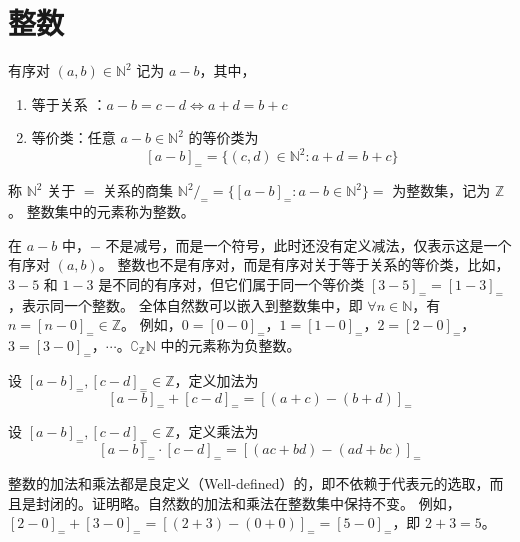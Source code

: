 \section{整数}

\begin{definition}[整数 Integer]
    有序对 $(a,b)\in \mathbb{N}^2$ 记为 $a-b$，其中，
    \begin{enumerate}
        \item 等于关系 ：$a-b=c-d \iff a+d=b+c$
        \item 等价类：任意 $a-b\in\mathbb{N}^2$ 的等价类为
        \[
            [a-b]_{=} = \{(c,d)\in\mathbb{N}^2 : a+d=b+c\} 
        \]
    \end{enumerate}
    称 $\mathbb{N}^2$ 关于 $=$ 关系的商集 $\mathbb{N}^2/_{=}= \{[a-b]_{=} : a-b \in \mathbb{N}^2\}= $ 为整数集，记为 $\mathbb{Z}$。
    整数集中的元素称为整数。
\end{definition}
\begin{note}
    在 $a-b$ 中，$-$ 不是减号，而是一个符号，此时还没有定义减法，仅表示这是一个有序对 $(a,b)$。
    整数也不是有序对，而是有序对关于等于关系的等价类，比如， $3-5$ 和 $1-3$ 是不同的有序对，但它们属于同一个等价类 $[3-5]_{=}=[1-3]_{=}$，表示同一个整数。
    全体自然数可以嵌入到整数集中，即 $\forall n\in\mathbb{N}$，有 $n = [n-0]_{=}\in\mathbb{Z}$。
    例如，$0 = [0-0]_{=}$，$1 = [1-0]_{=}$，$2 = [2-0]_{=}$，$3 = [3-0]_{=}$，$\cdots$。$\complement_{\mathbb{Z}}\mathbb{N}$ 中的元素称为负整数。
\end{note}
\vspace{1em}

\begin{definition}
    设 $[a-b]_{=},[c-d]_{=}\in\mathbb{Z}$，定义加法为
    \[
        [a-b]_{=} + [c-d]_{=} = [(a+c)-(b+d)]_{=}
    \]
\end{definition}

\begin{definition}
    设 $[a-b]_{=},[c-d]_{=}\in\mathbb{Z}$，定义乘法为
    \[
        [a-b]_{=} \cdot [c-d]_{=} = [(ac+bd)-(ad+bc)]_{=}
    \]
\end{definition}

\begin{note}
    整数的加法和乘法都是良定义（Well-defined）的，即不依赖于代表元的选取，而且是封闭的。证明略。自然数的加法和乘法在整数集中保持不变。
    例如，$[2-0]_{=} + [3-0]_{=} = [(2+3)-(0+0)]_{=} = [5-0]_{=}$，即 $2+3=5$。
\end{note}


